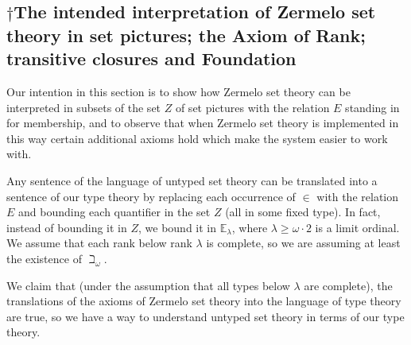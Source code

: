 \documentclass[12pt]{book}
\begin{document}
\subsection{$\dagger$The intended interpretation of Zermelo set theory in set pictures; the Axiom of Rank; transitive closures and Foundation}

Our intention in this section is to show how Zermelo set theory can be
interpreted in subsets of the set $Z$ of set pictures with the
relation $E$ standing in for membership, and to observe that when
Zermelo set theory is implemented in this way certain additional
axioms hold which make the system easier to work with.

Any sentence of the language of untyped set theory can be translated
into a sentence of our type theory by replacing each occurrence of
$\in$ with the relation $E$ and bounding each quantifier in the set
$Z$ (all in some fixed type).  In fact, instead of bounding it in $Z$,
we bound it in ${\mathbb E}_{\lambda}$, where $\lambda \geq
\omega\cdot 2$ is a limit ordinal.  We assume that each rank below
rank $\lambda$ is complete, so we are assuming at least the existence
of $\beth_{\omega}$.

We claim that (under the assumption that all types below $\lambda$ are
complete), the translations of the axioms of Zermelo set theory into
the language of type theory are true, so we have a way to understand
untyped set theory in terms of our type theory.
\end{document}
